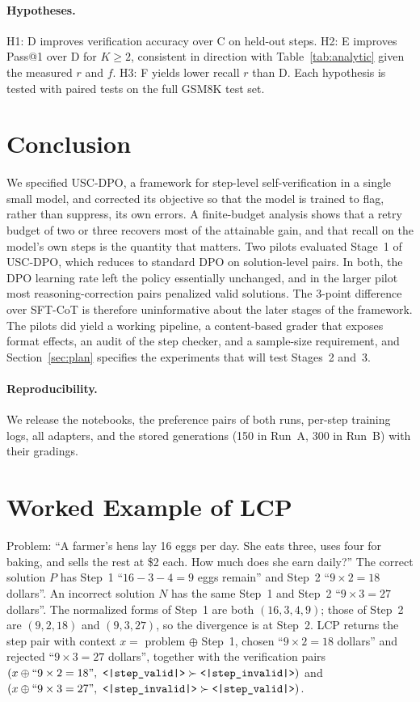 \documentclass[11pt, a4paper]{article}
\newcommand{\valid}{\texttt{<|step\_\allowbreak valid|>}}
\newcommand{\invalid}{\texttt{<|step\_\allowbreak invalid|>}}
\begin{document}
\paragraph{Hypotheses.} H1: D improves verification accuracy over C on held-out steps. H2: E improves Pass@1 over D for $K\ge2$, consistent in direction with Table~\ref{tab:analytic} given the measured $r$ and $f$. H3: F yields lower recall $r$ than D. Each hypothesis is tested with paired tests on the full GSM8K test set.

\section{Conclusion}
\label{sec:conclusion}
We specified USC-DPO, a framework for step-level self-verification in a single small model, and corrected its objective so that the model is trained to flag, rather than suppress, its own errors. A finite-budget analysis shows that a retry budget of two or three recovers most of the attainable gain, and that recall on the model's own steps is the quantity that matters. Two pilots evaluated Stage~1 of USC-DPO, which reduces to standard DPO on solution-level pairs. In both, the DPO learning rate left the policy essentially unchanged, and in the larger pilot most reasoning-correction pairs penalized valid solutions. The 3-point difference over SFT-CoT is therefore uninformative about the later stages of the framework. The pilots did yield a working pipeline, a content-based grader that exposes format effects, an audit of the step checker, and a sample-size requirement, and Section~\ref{sec:plan} specifies the experiments that will test Stages~2 and~3.

\paragraph{Reproducibility.} We release the notebooks, the preference pairs of both runs, per-step training logs, all adapters, and the stored generations (150 in Run~A, 300 in Run~B) with their gradings.

\appendix
\section{Worked Example of LCP}
\label{app:lcp}
Problem: ``A farmer's hens lay 16 eggs per day. She eats three, uses four for baking, and sells the rest at \$2 each. How much does she earn daily?'' The correct solution $P$ has Step~1 ``$16-3-4=9$ eggs remain'' and Step~2 ``$9\times 2=18$ dollars''. An incorrect solution $N$ has the same Step~1 and Step~2 ``$9\times 3=27$ dollars''. The normalized forms of Step~1 are both $(16,3,4,9)$; those of Step~2 are $(9,2,18)$ and $(9,3,27)$, so the divergence is at Step~2. LCP returns the step pair with context $x=$ problem $\oplus$ Step~1, chosen ``$9\times2=18$ dollars'' and rejected ``$9\times3=27$ dollars'', together with the verification pairs $(x\oplus\text{``}9\times2=18\text{''},\ \valid\succ\invalid)$ and $(x\oplus\text{``}9\times3=27\text{''},\ \invalid\succ\valid)$.
\end{document}
